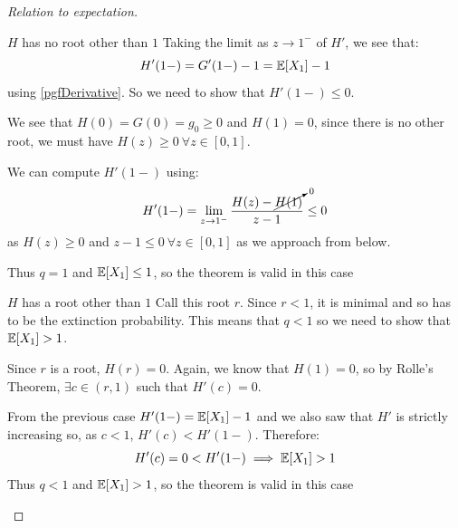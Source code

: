 \documentclass[../main.tex]{subfiles}
\begin{document}
\begin{proof}[Relation to expectation]
\begin{proofcases}
\begin{case}{$H$ has no root other than $1$}
      Taking the limit as $z \to 1^{-}$ of $H'$, we see that:
      \[
        H'(1-) = G'(1-) - 1 = \mathbb{E}[X_1] - 1
      \]
      using \cref{pgfDerivative}.
      So we need to show that $H'(1-) \leq 0$.

      We see that $H(0) = G(0) = g_0 \geq 0$ and $H(1) = 0$, since there is no other root, we must have $H(z) \geq 0\ \forall z \in [0, 1]$.

      We can compute $H'(1-)$ using:
      \[
        H'(1-) = \lim_{z \to 1^{-}} \frac{H(z) - \cancelto{0}{H(1)}}{z - 1} \leq 0
      \]
      as $H(z) \geq 0$ and $z - 1 \leq 0\ \forall z \in [0, 1]$ as we approach from below.

      Thus $q = 1$ and $\mathbb{E}[X_1] \leq 1$, so the theorem is valid in this case \tick
    \end{case}
    \begin{case}{$H$ has a root other than $1$}
      Call this root $r$.
      Since $r < 1$, it is minimal and so has to be the extinction probability.
      This means that $q < 1$ so we need to show that $\mathbb{E}[X_1] > 1$.

      Since $r$ is a root, $H(r) = 0$.
      Again, we know that $H(1) = 0$, so by Rolle's Theorem, $\exists c \in (r, 1)$ such that $H'(c) = 0$.

      From the previous case $H'(1-) = \mathbb{E}[X_1] - 1$ and we also saw that $H'$ is strictly increasing so, as $c < 1$, $H'(c) < H'(1-)$.
      Therefore:
      \[
        H'(c) = 0 < H'(1-) \implies \mathbb{E}[X_1] > 1
      \]
      Thus $q < 1$ and $\mathbb{E}[X_1] > 1$, so the theorem is valid in this case \tick
    \end{case}
  \end{proofcases}
\end{proof}
\end{document}
